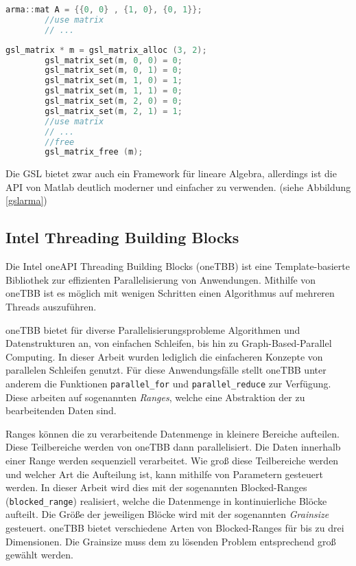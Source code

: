 \begin{center}
    \begin{lstlisting}[language=C++,style=cpp]
        arma::mat A = {{0, 0} , {1, 0}, {0, 1}};
        //use matrix 
        // ...
    \end{lstlisting}
    \begin{lstlisting}[language=C++,style=cpp]
        gsl_matrix * m = gsl_matrix_alloc (3, 2);
        gsl_matrix_set(m, 0, 0) = 0;
        gsl_matrix_set(m, 0, 1) = 0;
        gsl_matrix_set(m, 1, 0) = 1;
        gsl_matrix_set(m, 1, 1) = 0;
        gsl_matrix_set(m, 2, 0) = 0;
        gsl_matrix_set(m, 2, 1) = 1;
        //use matrix 
        // ...
        //free
        gsl_matrix_free (m);
    \end{lstlisting}
    \label{gslarma}
\end{center}

Die GSL bietet zwar auch ein Framework für lineare Algebra, allerdings ist die API von Matlab deutlich moderner und einfacher zu verwenden. (siehe Abbildung \ref{gslarma})


\subsection{Intel Threading Building Blocks}


Die Intel\textsuperscript{\textcopyright} oneAPI Threading Building Blocks (oneTBB) ist eine Template-basierte Bibliothek zur effizienten Parallelisierung von Anwendungen. 
Mithilfe von oneTBB ist es möglich mit wenigen Schritten einen Algorithmus auf mehreren Threads auszuführen.

oneTBB bietet für diverse Parallelisierungsprobleme  Algorithmen und Datenstrukturen an, von einfachen Schleifen, bis hin zu Graph-Based-Parallel Computing.
In dieser Arbeit wurden lediglich die einfacheren Konzepte von parallelen Schleifen genutzt. Für diese Anwendungsfälle stellt oneTBB unter anderem die Funktionen \texttt{parallel\_for} und \texttt{parallel\_reduce}
zur Verfügung. Diese arbeiten auf sogenannten \textit{Ranges}, welche eine Abstraktion der zu bearbeitenden Daten sind.

Ranges können die zu verarbeitende Datenmenge in kleinere Bereiche aufteilen. Diese Teilbereiche werden von oneTBB dann parallelisiert. Die Daten innerhalb einer Range werden sequenziell verarbeitet. 
Wie groß diese Teilbereiche werden und welcher Art die Aufteilung ist, kann mithilfe von Parametern gesteuert werden. In dieser Arbeit wird dies mit der sogenannten Blocked-Ranges (\texttt{blocked\_range}) realisiert, welche die Datenmenge in kontinuierliche Blöcke aufteilt. Die Größe der jeweiligen Blöcke wird mit der sogenannten \textit{Grainsize} gesteuert.
oneTBB bietet verschiedene Arten von Blocked-Ranges für bis zu drei Dimensionen. Die Grainsize muss dem zu lösenden Problem entsprechend groß gewählt werden.


